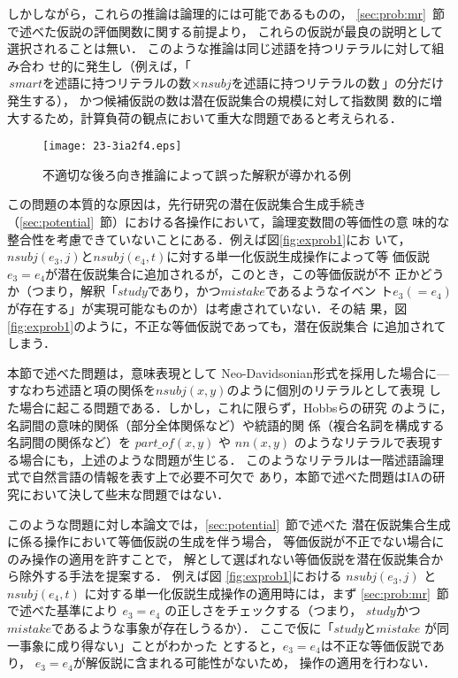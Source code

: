 \documentclass[japanese]{jnlp_1.4}
\begin{document}
しかしながら，これらの推論は論理的には可能であるものの，
\ref{sec:prob:mr}~節で述べた仮説の評価関数に関する前提より，
これらの仮説が最良の説明として選択されることは無い．
このような推論は同じ述語を持つリテラルに対して組み合わ
せ的に発生し（例えば，「$\textit{smart} \text{を述語に持つリテラルの数} \times \textit{nsubj} \text{を述語に持つリテラルの数}$」の分だけ発生する），
かつ候補仮説の数は潜在仮説集合の規模に対して指数関
数的に増大するため，計算負荷の観点において重大な問題であると考えられる．

\begin{figure}[t]
\begin{center}
\texttt{[image: 23-3ia2f4.eps]}
\end{center}
\caption{不適切な後ろ向き推論によって誤った解釈が導かれる例}
\label{fig:exprob2}
\end{figure}

この問題の本質的な原因は，先行研究の潜在仮説集合生成手続き
（\ref{sec:potential}~節）における各操作において，論理変数間の等価性の意
味的な整合性を考慮できていないことにある．例えば図\ref{fig:exprob1}にお
いて，$\mathit{nsubj}(e_3,j)$と$\mathit{nsubj}(e_4,t)$に対する単一化仮説生成操作によって等
価仮説$e_3=e_4$が潜在仮説集合に追加されるが，このとき，この等価仮説が不
正かどうか（つまり，解釈「$\mathit{study}$であり，かつ$\mathit{mistake}$であるようなイベン
ト$e_3(=e_4)$が存在する」が実現可能なものか）は考慮されていない．その結
果，図\ref{fig:exprob1}のように，不正な等価仮説であっても，潜在仮説集合
に追加されてしまう．

本節で述べた問題は，意味表現として Neo-Davidsonian形式を採用した場合に—すなわち述語と項の関係を$\mathit{nsubj}(x,y)$のように個別のリテラルとして表現
した場合に起こる問題である．しかし，これに限らず，Hobbsらの研究
\cite{Hobbs93}のように，名詞間の意味的関係（部分全体関係など）や統語的関
係（複合名詞を構成する名詞間の関係など）を $\mathit{part\_of}(x,y)$ や
$\mathit{nn}(x,y)$ のようなリテラルで表現する場合にも，上述のような問題が生じる．
このようなリテラルは一階述語論理式で自然言語の情報を表す上で必要不可欠で
あり，本節で述べた問題はIAの研究において決して些末な問題ではない．


このような問題に対し本論文では，\ref{sec:potential}~節で述べた
潜在仮説集合生成に係る操作において等価仮説の生成を伴う場合，
等価仮説が不正でない場合にのみ操作の適用を許すことで，
解として選ばれない等価仮説を潜在仮説集合から除外する手法を提案する．
例えば図
\ref{fig:exprob1}における $\mathit{nsubj}(e_3,j)$ と $\mathit{nsubj}(e_4,t)$ に対する単一化仮説生成操作の適用時には，まず \ref{sec:prob:mr}~節で述べた基準により
$e_3=e_4$ の正しさをチェックする（つまり，
$\mathit{study}$かつ$\mathit{mistake}$であるような事象が存在しうるか）．
ここで仮に「$\mathit{study}$と$\mathit{mistake}$ が同一事象に成り得ない」ことがわかった
とすると，$e_3=e_4$は不正な等価仮説であり，
$e_3=e_4$が解仮説に含まれる可能性がないため，
操作の適用を行わない．
\end{document}
